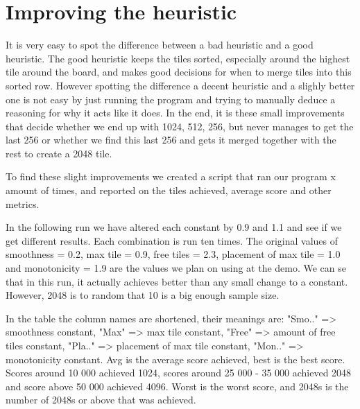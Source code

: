 \section{Improving the heuristic}

It is very easy to spot the difference between a bad heuristic and a good heuristic.
The good heuristic keeps the tiles sorted, especially around the highest tile around
the board, and makes good decisions for when to merge tiles into this sorted row.
However spotting the difference a decent heuristic and a slighly better one is not
easy by just running the program and trying to manually deduce a reasoning for why
it acts like it does. In the end, it is these small improvements that decide whether
we end up with 1024, 512, 256, but never manages to get the last 256 or whether
we find this last 256 and gets it merged together with the rest to create a 2048 tile.

To find these slight improvements we created a script that ran our program x amount of
times, and reported on the tiles achieved, average score and other metrics.

In the following run we have altered each constant by 0.9 and 1.1 and see if we
get different results. Each combination is run ten times. The original values
of smoothness = 0.2, max tile = 0.9, free tiles = 2.3, placement of max tile = 1.0
and monotonicity = 1.9 are the values we plan on using at the demo. We can se
that in this run, it actually achieves better than any small change to a constant.
However, 2048 is to random that 10 is a big enough sample size.

In the table the column names are shortened, their meanings are: "Smo.." => smoothness
constant, "Max" => max tile constant, "Free" => amount of free tiles constant,
"Pla.." => placement of max tile constant, "Mon.." => monotonicity constant. Avg is the
average score achieved, best is the best score. Scores around 10 000 achieved 1024,
scores around 25 000 - 35 000 achieved 2048 and score above 50 000 achieved 4096.
Worst is the worst score, and 2048s is the number of 2048s or above that was achieved.

